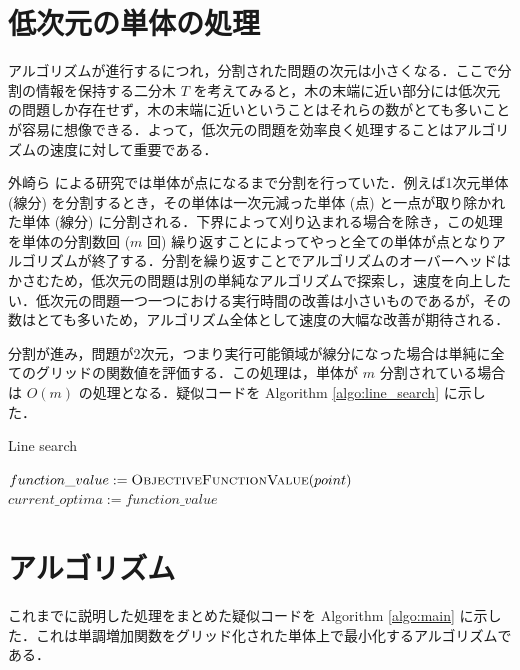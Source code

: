 \documentclass[a4paper,11pt]{jreport}
\begin{document}
\section{低次元の単体の処理}

アルゴリズムが進行するにつれ，分割された問題の次元は小さくなる．ここで分割の情報を保持する二分木 $ T $ を考えてみると，木の末端に近い部分には低次元の問題しか存在せず，木の末端に近いということはそれらの数がとても多いことが容易に想像できる．よって，低次元の問題を効率良く処理することはアルゴリズムの速度に対して重要である．\par
外崎ら \cite{tonosaki} による研究では単体が点になるまで分割を行っていた．例えば1次元単体 (線分) を分割するとき，その単体は一次元減った単体 (点) と一点が取り除かれた単体 (線分) に分割される．下界によって刈り込まれる場合を除き，この処理を単体の分割数回 ($ m $ 回) 繰り返すことによってやっと全ての単体が点となりアルゴリズムが終了する．分割を繰り返すことでアルゴリズムのオーバーヘッドはかさむため，低次元の問題は別の単純なアルゴリズムで探索し，速度を向上したい．低次元の問題一つ一つにおける実行時間の改善は小さいものであるが，その数はとても多いため，アルゴリズム全体として速度の大幅な改善が期待される．\par
分割が進み，問題が2次元，つまり実行可能領域が線分になった場合は単純に全てのグリッドの関数値を評価する．この処理は，単体が $ m $ 分割されている場合は $ O(m) $ の処理となる．疑似コードを Algorithm \ref{algo:line_search} に示した．\par

\begin{algorithm}
\caption{Line search}
\label{algo:line_search}
\begin{algorithmic}[1]
\State $ function\_value := \Call{ObjectiveFunctionValue}{point} $
\State $current\_optima := function\_value $
\EndIf
\EndFor
\EndFunction
\end{algorithmic}
\end{algorithm}

\section{アルゴリズム}

これまでに説明した処理をまとめた疑似コードを Algorithm \ref{algo:main} に示した．これは単調増加関数をグリッド化された単体上で最小化するアルゴリズムである．\par
\end{document}
